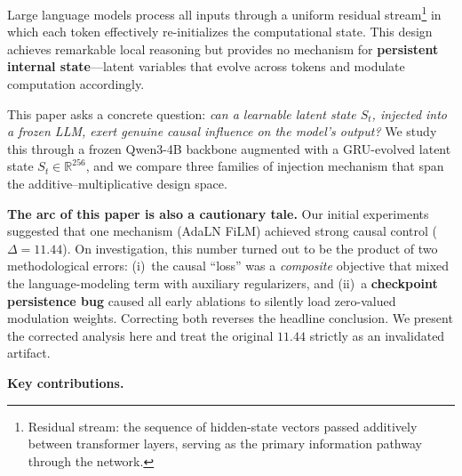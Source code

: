 \documentclass[11pt,a4paper]{article}
\newcommand{\R}{\mathbb{R}}
\newcommand{\St}{S_t}
\begin{document}
Large language models process all inputs through a uniform residual
stream\footnote{Residual stream: the sequence of hidden-state vectors passed
additively between transformer layers, serving as the primary information pathway
through the network.} in which each token effectively re-initializes the computational
state. This design achieves remarkable local reasoning but provides no mechanism for
\textbf{persistent internal state}---latent variables that evolve across tokens and
modulate computation accordingly.

This paper asks a concrete question: \emph{can a learnable latent state $\St$, injected
into a frozen LLM, exert genuine causal influence on the model's output?} We study
this through a frozen Qwen3-4B backbone augmented with a GRU-evolved latent state
$\St \in \R^{256}$, and we compare three families of injection mechanism that span the
additive--multiplicative design space.

\textbf{The arc of this paper is also a cautionary tale.} Our initial experiments
suggested that one mechanism (AdaLN FiLM) achieved strong causal control
($\Delta = 11.44$). On investigation, this number turned out to be the product of two
methodological errors: (i)~the causal ``loss'' was a \emph{composite} objective that
mixed the language-modeling term with auxiliary regularizers, and (ii)~a
\textbf{checkpoint persistence bug} caused all early ablations to silently load
zero-valued modulation weights. Correcting both reverses the headline conclusion. We
present the corrected analysis here and treat the original $11.44$ strictly as an
invalidated artifact.

\textbf{Key contributions.}
\end{document}
